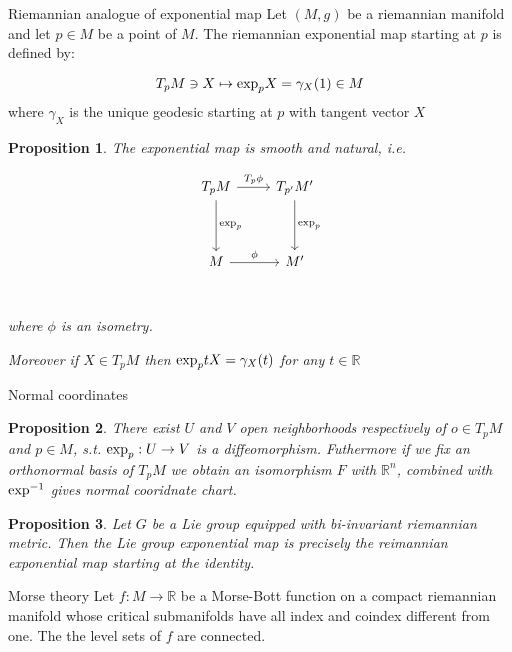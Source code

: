 \documentclass{beamer}
\newtheorem{proposition}{Proposition}[theorem]
\def\exp{{\rm exp}}
\def\R{\mathbb{R}}
\begin{document}
\begin{frame}{Riemannian analogue of exponential map}
    Let $(M,g)$ be a riemannian manifold and let $p \in M$ be a point of $M$. The riemannian exponential map starting at $p$ is defined by:
    
    \[ 
        T_p M \ni X \mapsto \exp_p X = \gamma_X(1) \in M
    \]
    where $\gamma_X$ is the unique geodesic starting at $p$ with tangent vector $X$

    \begin{proposition}


        The exponential map is smooth and natural, i.e.

        \[
            \begin{tikzcd}[ampersand replacement=\&, column sep=small]
                {T_p M} \&  \&{T_{p'} M'} \\
                \\ 
                M \& \&  M' \\
                \arrow["\exp_p",from=1-1, to=3-1]
                \arrow["T_p \phi", from=1-1, to=1-3]
                \arrow["\exp_p",from=1-3, to=3-3]
                \arrow["\phi", from=3-1, to=3-3]
            \end{tikzcd}
        \]
        where $\phi$ is an isometry.

        Moreover if $X \in T_p M$ then $\exp_p tX = \gamma_X (t)$ for  any $t \in \R$
    \end{proposition}
            
\end{frame}
\begin{frame}{Normal coordinates}
    \begin{proposition}
        There exist $U$ and $V$ open neighborhoods respectively of $o \in T_p M$ and $p \in M$, s.t. $\exp_p : U \to V$ is a diffeomorphism. Futhermore if we fix an orthonormal basis of $T_p M$ we obtain an isomorphism $F$ with $\R^n$, combined with $\exp^{-1}$ gives normal cooridnate chart.
       
    \end{proposition}
   \begin{proposition}
       Let $G$ be a Lie group equipped with bi-invariant riemannian metric. Then the Lie group exponential map is precisely the reimannian exponential map starting at the identity.
   \end{proposition}
\end{frame}

\begin{frame}{Morse theory}
    Let $f: M \to \R$ be a Morse-Bott function on a compact riemannian manifold whose critical submanifolds have all index and coindex different from one. The the level sets of $f$ are connected.
\end{frame}
\end{document}
